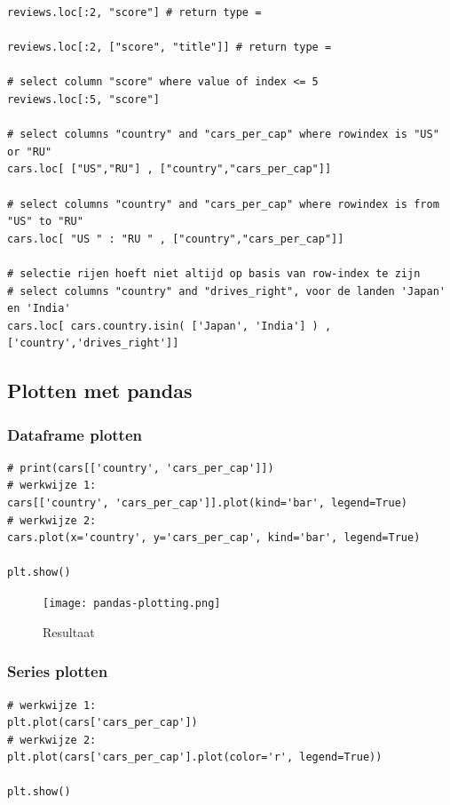 \documentclass{article}
\begin{document}
\begin{verbatim}
reviews.loc[:2, "score"] # return type = 

reviews.loc[:2, ["score", "title"]] # return type = 

# select column "score" where value of index <= 5
reviews.loc[:5, "score"]

# select columns "country" and "cars_per_cap" where rowindex is "US" or "RU"
cars.loc[ ["US","RU"] , ["country","cars_per_cap"]]

# select columns "country" and "cars_per_cap" where rowindex is from "US" to "RU"
cars.loc[ "US " : "RU " , ["country","cars_per_cap"]]

# selectie rijen hoeft niet altijd op basis van row-index te zijn
# select columns "country" and "drives_right", voor de landen 'Japan' en 'India'
cars.loc[ cars.country.isin( ['Japan', 'India'] ) , ['country','drives_right']]
\end{verbatim}

\subsection{Plotten met pandas}

\subsubsection{Dataframe plotten}

\begin{verbatim}
# print(cars[['country', 'cars_per_cap']])
# werkwijze 1:
cars[['country', 'cars_per_cap']].plot(kind='bar', legend=True)
# werkwijze 2:
cars.plot(x='country', y='cars_per_cap', kind='bar', legend=True)

plt.show()
\end{verbatim}

\begin{figure}[H]
    \centering
    \texttt{[image: pandas-plotting.png]}
    \caption{Resultaat}
\end{figure}

\subsubsection{Series plotten}

\begin{verbatim}
# werkwijze 1:
plt.plot(cars['cars_per_cap'])
# werkwijze 2:
plt.plot(cars['cars_per_cap'].plot(color='r', legend=True))

plt.show()
\end{verbatim}
\end{document}
